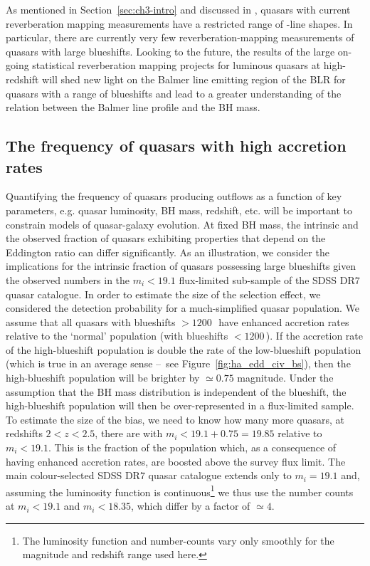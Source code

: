As mentioned in Section~\ref{sec:ch3-intro} and discussed in \citet{richards11}, quasars with current reverberation mapping measurements have a restricted range of -line shapes. 
In particular, there are currently very few reverberation-mapping measurements of quasars with large  blueshifts. 
Looking to the future, the results of the large on-going statistical reverberation mapping projects \citep[e.g.][]{shen15,kingoz15} for luminous quasars at high-redshift will shed new light on the Balmer line emitting region of the BLR for quasars with a range of  blueshifts and lead to a greater understanding of the relation between the Balmer line profile and the BH mass.


\subsection{The frequency of quasars with high accretion rates}

Quantifying the frequency of quasars producing outflows as a function of key parameters, e.g. quasar luminosity, BH mass, redshift, etc. will be important to constrain models of quasar-galaxy evolution.  
At fixed BH mass, the intrinsic and the observed fraction of quasars exhibiting properties that depend on the Eddington ratio can differ significantly. 
As an illustration, we consider the implications for the intrinsic fraction of quasars possessing large  blueshifts given the observed numbers in the $m_i<19.1$ flux-limited sub-sample of the SDSS DR$7$ quasar catalogue. 
In order to estimate the size of the selection effect, we considered the detection probability for a much-simplified quasar population. 
We assume that all quasars with  blueshifts $>1200$\,\kms\, have enhanced accretion rates relative to the `normal' population (with  blueshifts $<1200$\,\kms). 
If the accretion rate of the high-blueshift population is double the rate of the low-blueshift population (which is true in an average sense \---\ see Figure~\ref{fig:ha_edd_civ_bs}), then the high-blueshift population will be brighter by $\simeq0.75$ magnitude.
Under the assumption that the BH mass distribution is independent of the  blueshift, the high-blueshift population will then be over-represented in a flux-limited sample.
To estimate the size of the bias, we need to know how many more quasars, at redshifts $2 < z < 2.5$, there are with $m_i<19.1+0.75=19.85$ relative to $m_i < 19.1$.
This is the fraction of the population which, as a consequence of having enhanced accretion rates, are boosted above the survey flux limit.    
The main colour-selected SDSS DR$7$ quasar catalogue extends only to $m_i= 19.1$ and, assuming the luminosity function is continuous\footnote{The luminosity function and number-counts vary only smoothly \citep[e.g.][]{ross13} for the magnitude and redshift range used here.} we thus use the number counts at $m_i < 19.1$ and $m_i < 18.35$, which differ by a factor of $\simeq 4$. 


